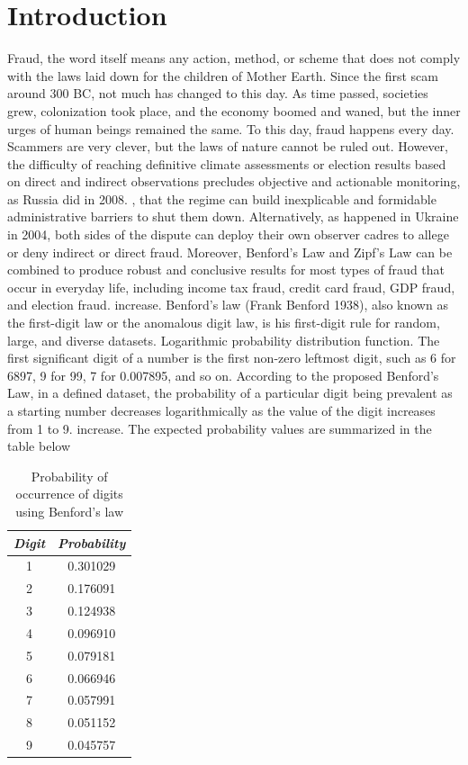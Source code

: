 \documentclass[conference]{IEEEtran}
\begin{document}
\section{Introduction}
Fraud, the word itself means any action, method, or scheme that does not comply with the laws laid down for the children of Mother Earth. Since the first scam around 300 BC, not much has changed to this day. As time passed, societies grew, colonization took place, and the economy boomed and waned, but the inner urges of human beings remained the same. To this day, fraud happens every day. Scammers are very clever, but the laws of nature cannot be ruled out. However, the difficulty of reaching definitive climate assessments or election results based on direct and indirect observations precludes objective and actionable monitoring, as Russia did in 2008. , that the regime can build inexplicable and formidable administrative barriers to shut them down. Alternatively, as happened in Ukraine in 2004, both sides of the dispute can deploy their own observer cadres to allege or deny indirect or direct fraud. Moreover, Benford's Law and Zipf's Law can be combined to produce robust and conclusive results for most types of fraud that occur in everyday life, including income tax fraud, credit card fraud, GDP fraud, and election fraud. increase. Benford's law (Frank Benford 1938), also known as the first-digit law or the anomalous digit law, is his first-digit rule for random, large, and diverse datasets. Logarithmic probability distribution function. The first significant digit of a number is the first non-zero leftmost digit, such as 6 for 6897, 9 for 99, 7 for 0.007895, and so on. According to the proposed Benford's Law, in a defined dataset, the probability of a particular digit being prevalent as a starting number decreases logarithmically as the value of the digit increases from 1 to 9. increase. The expected probability values are summarized in the table below
\begin{table}[htbp]
\caption{Probability of occurrence of digits using Benford’s law}
\begin{center}
\begin{tabular}{|c|c|}
\hline
\textbf{\textit{Digit}} & \textbf{\textit{Probability}} \\
\hline
1       & 0.301029 \\
\hline
2      & 0.176091 \\
\hline
3     & 0.124938 \\
\hline
4    & 0.096910 \\
\hline
5   & 0.079181 \\
\hline
6  & 0.066946 \\
\hline
7 & 0.057991 \\
\hline
8 & 0.051152 \\
\hline
9 & 0.045757 \\
\hline
\end{tabular}
\label{tab1}
\end{center}
\end{table}
\end{document}
